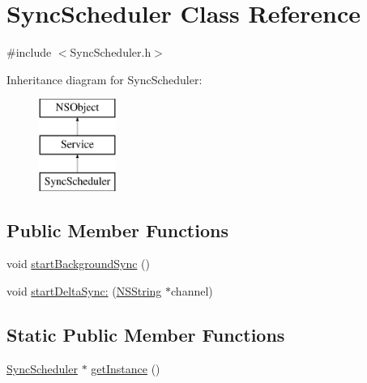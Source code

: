 \hypertarget{interface_sync_scheduler}{
\section{\-Sync\-Scheduler \-Class \-Reference}
\label{interface_sync_scheduler}
}


{\ttfamily \#include $<$\-Sync\-Scheduler.\-h$>$}

\-Inheritance diagram for \-Sync\-Scheduler\-:\begin{figure}[H]
\begin{center}
\leavevmode
\includegraphics[height=3.000000cm]{interface_sync_scheduler}
\end{center}
\end{figure}
\subsection*{\-Public \-Member \-Functions}
\begin{DoxyCompactItemize}
\item 
void \hyperlink{interface_sync_scheduler_a6426a038015079a508ccafc72e754b1b}{start\-Background\-Sync} ()
\item 
void \hyperlink{interface_sync_scheduler_aa5755bf09ff0ef0566a3f7544d59f11b}{start\-Delta\-Sync\-:} (\hyperlink{class_n_s_string}{\-N\-S\-String} $\ast$channel)
\end{DoxyCompactItemize}
\subsection*{\-Static \-Public \-Member \-Functions}
\begin{DoxyCompactItemize}
\item 
\hyperlink{interface_sync_scheduler}{\-Sync\-Scheduler} $\ast$ \hyperlink{interface_sync_scheduler_a949dd9ba8a2e4dafa45193805b935495}{get\-Instance} ()
\end{DoxyCompactItemize}


